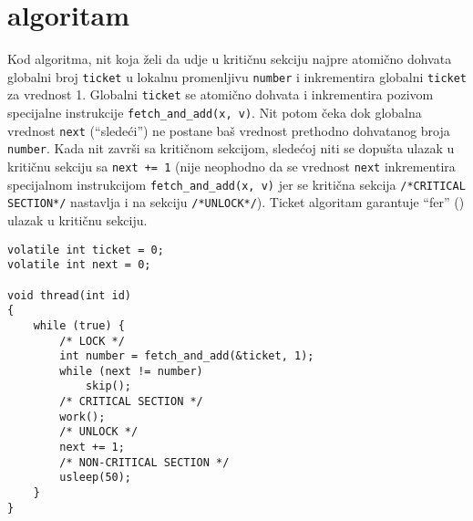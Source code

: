 \clearpage
\section{ algoritam}
Kod \textbf{} algoritma, nit koja \v{z}eli da udje u kriti\v{c}nu sekciju najpre atomi\v{c}no dohvata globalni broj \texttt{ticket} u lokalnu promenljivu \texttt{number} i inkrementira globalni \texttt{ticket} za vrednost 1. Globalni \texttt{ticket} se atomi\v{c}no dohvata i inkrementira pozivom specijalne instrukcije \texttt{fetch\_and\_add(x, v)}. Nit potom \v{c}eka dok globalna vrednost \texttt{next} (``slede\'{c}i'') ne postane ba\v{s} vrednost prethodno dohvatanog broja \texttt{number}. Kada nit zavr\v{s}i sa kriti\v{c}nom sekcijom, slede\'{c}oj niti se dopu\v{s}ta ulazak u kriti\v{c}nu sekciju sa \texttt{next += 1} (nije neophodno da se vrednost \texttt{next} inkrementira specijalnom instrukcijom \texttt{fetch\_and\_add(x, v)} jer se kriti\v{c}na sekcija \texttt{/*CRITICAL SECTION*/} nastavlja i na sekciju \texttt{/*UNLOCK*/}).  Ticket algoritam garantuje ``fer'' () ulazak u kriti\v{c}nu sekciju.
\begin{lstlisting}
volatile int ticket = 0;
volatile int next = 0;

void thread(int id)
{
    while (true) {
		/* LOCK */
        int number = fetch_and_add(&ticket, 1);
        while (next != number)
            skip();
		/* CRITICAL SECTION */
		work();
		/* UNLOCK */
		next += 1;
		/* NON-CRITICAL SECTION */
        usleep(50);
    }
}
\end{lstlisting}